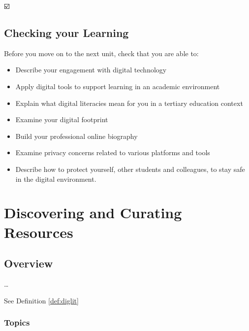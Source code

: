 \documentclass[
]{book}
\providecommand{\tightlist}{%
  \setlength{\itemsep}{0pt}\setlength{\parskip}{0pt}}
\theoremstyle{definition}
\theoremstyle{definition}
\theoremstyle{definition}
\theoremstyle{definition}
\theoremstyle{remark}
\begin{document}
☑️

\hypertarget{checking-your-learning}{%
\section*{Checking your Learning}\label{checking-your-learning}}

\begin{progress}
Before you move on to the next unit, check that you are able to:

\begin{itemize}
\tightlist
\item
  Describe your engagement with digital technology\\
\item
  Apply digital tools to support learning in an academic environment\\
\item
  Explain what digital literacies mean for you in a tertiary education context\\
\item
  Examine your digital footprint\\
\item
  Build your professional online biography\\
\item
  Examine privacy concerns related to various platforms and tools\\
\item
  Describe how to protect yourself, other students and colleagues, to stay safe in the digital environment.
\end{itemize}
\end{progress}

\hypertarget{discovering-and-curating-resources}{%
\chapter{Discovering and Curating Resources}\label{discovering-and-curating-resources}}

\hypertarget{overview-1}{%
\section*{Overview}\label{overview-1}}

\ldots{}

See Definition \ref{def:diglit}

\hypertarget{topics-1}{%
\subsection*{Topics}\label{topics-1}}
\end{document}

